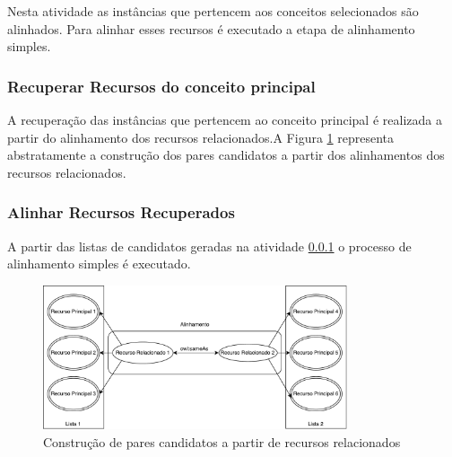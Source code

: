 Nesta atividade as instâncias que pertencem aos conceitos selecionados são alinhados. Para alinhar esses recursos é executado a etapa de alinhamento simples.

\subsubsection{Recuperar Recursos do conceito principal}
\label{recuperao}

A recuperação das instâncias que pertencem ao conceito principal é realizada a partir do  alinhamento dos recursos relacionados.A Figura \ref{fig:relacionados} representa abstratamente a construção dos pares candidatos a partir dos alinhamentos dos recursos relacionados.

\subsubsection{Alinhar Recursos Recuperados}

A partir das listas de candidatos geradas na atividade \ref{recuperao} o processo de alinhamento simples é executado.

\begin{figure}[!ht]
	\centering
	\includegraphics[width=0.8\textwidth]{./imagens/relacionados.pdf}
    \caption{Construção de pares candidatos a partir de recursos relacionados}
	\label{fig:relacionados}
\end{figure}